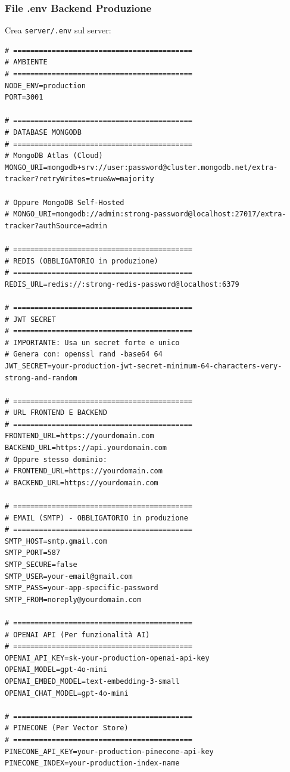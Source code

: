 \documentclass[11pt,a4paper]{article}
\newcommand{\code}[1]{\texttt{#1}}
\begin{document}
\subsubsection{File .env Backend Produzione}

Crea \code{server/.env} sul server:

\begin{lstlisting}[caption=server/.env - Produzione]
# ==========================================
# AMBIENTE
# ==========================================
NODE_ENV=production
PORT=3001

# ==========================================
# DATABASE MONGODB
# ==========================================
# MongoDB Atlas (Cloud)
MONGO_URI=mongodb+srv://user:password@cluster.mongodb.net/extra-tracker?retryWrites=true&w=majority

# Oppure MongoDB Self-Hosted
# MONGO_URI=mongodb://admin:strong-password@localhost:27017/extra-tracker?authSource=admin

# ==========================================
# REDIS (OBBLIGATORIO in produzione)
# ==========================================
REDIS_URL=redis://:strong-redis-password@localhost:6379

# ==========================================
# JWT SECRET
# ==========================================
# IMPORTANTE: Usa un secret forte e unico
# Genera con: openssl rand -base64 64
JWT_SECRET=your-production-jwt-secret-minimum-64-characters-very-strong-and-random

# ==========================================
# URL FRONTEND E BACKEND
# ==========================================
FRONTEND_URL=https://yourdomain.com
BACKEND_URL=https://api.yourdomain.com
# Oppure stesso dominio:
# FRONTEND_URL=https://yourdomain.com
# BACKEND_URL=https://yourdomain.com

# ==========================================
# EMAIL (SMTP) - OBBLIGATORIO in produzione
# ==========================================
SMTP_HOST=smtp.gmail.com
SMTP_PORT=587
SMTP_SECURE=false
SMTP_USER=your-email@gmail.com
SMTP_PASS=your-app-specific-password
SMTP_FROM=noreply@yourdomain.com

# ==========================================
# OPENAI API (Per funzionalità AI)
# ==========================================
OPENAI_API_KEY=sk-your-production-openai-api-key
OPENAI_MODEL=gpt-4o-mini
OPENAI_EMBED_MODEL=text-embedding-3-small
OPENAI_CHAT_MODEL=gpt-4o-mini

# ==========================================
# PINECONE (Per Vector Store)
# ==========================================
PINECONE_API_KEY=your-production-pinecone-api-key
PINECONE_INDEX=your-production-index-name
\end{lstlisting}
\end{document}

